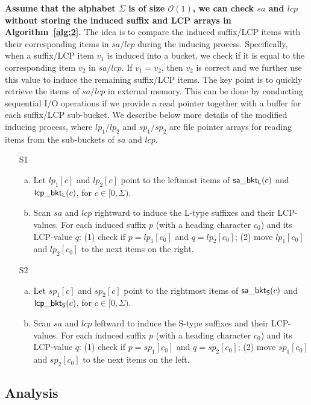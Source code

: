 \documentclass[10pt,journal,compsoc]{IEEEtran}
\begin{document}
{\bf Assume that the alphabet $\Sigma$ is of size $\mathcal{O}(1)$, we can check $sa$ and $lcp$ without storing the induced suffix and LCP arrays in Algorithm~\ref{alg:2}.} The idea is to compare the induced suffix/LCP items with their corresponding items in $sa/lcp$ during the inducing process. Specifically, when a suffix/LCP item $v_1$ is induced into a bucket, we check if it is equal to the corresponding item $v_2$ in $sa/lcp$. If $v_1 = v_2$, then $v_2$ is correct and we further use this value to induce the remaining suffix/LCP items. The key point is to quickly retrieve the items of $sa/lcp$ in external memory. This can be done by conducting sequential I/O operations if we provide a read pointer together with a buffer for each suffix/LCP sub-bucket. We describe below more details of the modified inducing process, where $lp_1/lp_2$ and $sp_1/sp_2$ are file pointer arrays for reading items from the sub-buckets of $sa$ and $lcp$.

\begin{enumerate}
	\item [S1]
	\begin{enumerate}[(a)]
		\item 
		Let $lp_1[c]$ and $lp_2[c]$ point to the leftmost items of ${\sf sa\_bkt_L}(c)$ and ${\sf lcp\_bkt_L}(c)$, for $c \in [0, \Sigma)$.
		\item 
		Scan $sa$ and $lcp$ rightward to induce the L-type suffixes and their LCP-values. For each induced suffix $p$ (with a heading character $c_0$) and its LCP-value $q$: (1) check if $p = lp_1[c_0]$ and $q = lp_2[c_0]$; (2) move $lp_1[c_0]$ and $lp_2[c_0]$ to the next items on the right.
	\end{enumerate}
	\item [S2]
	\begin{enumerate}[(a)]
		\item 	
		Let $sp_1[c]$ and $sp_2[c]$ point to the rightmost items of ${\sf sa\_bkt_S}(c)$ and ${\sf lcp\_bkt_S}(c)$, for $c \in [0, \Sigma)$.
		\item 	
		Scan $sa$ and $lcp$ leftward to induce the S-type suffixes and their LCP-values. For each induced suffix $p$ (with a heading character $c_0$) and its LCP-value $q$: (1) check if $p = sp_1[c_0]$ and $q = sp_2[c_0]$; (2) move $sp_1[c_0]$ and $sp_2[c_0]$ to the next items on the left.
	\end{enumerate}
\end{enumerate}

\subsection{Analysis} \label{sec:method2:analysis}
\end{document}
